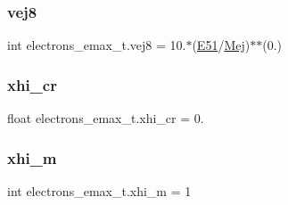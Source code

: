 \subsubsection{\texorpdfstring{vej8}{vej8}}
{\footnotesize\ttfamily int electrons\+\_\+emax\+\_\+t.\+vej8 = 10.$\ast$(\hyperlink{namespaceelectrons__emax__t_a60b4c05f730fff0bc98b225162ee76c3}{E51}/\hyperlink{namespaceelectrons__emax__t_a9373df60b4e1199cb22af1e4a4316073}{Mej})$\ast$$\ast$(0.)}

\mbox{\label{namespaceelectrons__emax__t_ac149ba9f878c8ef893acd0eb12c64e1c}} 
\subsubsection{\texorpdfstring{xhi\+\_\+cr}{xhi\_cr}}
{\footnotesize\ttfamily float electrons\+\_\+emax\+\_\+t.\+xhi\+\_\+cr = 0.}

\mbox{\label{namespaceelectrons__emax__t_acd80c62877ec9db1edb4a8662b7347f7}} 
\subsubsection{\texorpdfstring{xhi\+\_\+m}{xhi\_m}}
{\footnotesize\ttfamily int electrons\+\_\+emax\+\_\+t.\+xhi\+\_\+m = 1}

